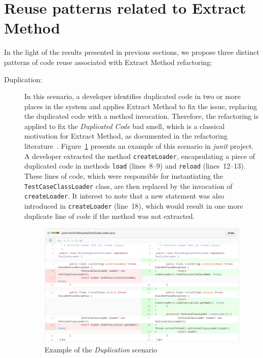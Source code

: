 \section{Reuse patterns related to Extract Method}
\label{reusepatterns}



In the light of the results presented in previous sections, we propose three distinct patterns of code reuse associated with Extract Method refactoring:
\begin{description}
\item[Duplication:] In this scenario, a developer identifies duplicated code in two or more places in the system and applies Extract Method to fix the issue, replacing the duplicated code with a method invocation.
Therefore, the refactoring is applied to fix the \emph{Duplicated Code} bad smell, which is a classical motivation for Extract Method, as documented in the refactoring literature~\citep{Fowler:1999}.
Figure~\ref{iexdup} presents an example of this scenario in \textit{junit} project. A developer extracted the method \texttt{createLoader}, encapsulating a piece of duplicated code in methods \texttt{load} (lines~8--9) and \texttt{reload} (lines~12--13).
These lines of code, which were responsible for instantiating the \texttt{TestCaseClassLoader} class, are then replaced by the invocation of \texttt{createLoader}. It interest to note that a new statement was also introduced in \texttt{createLoader} (line~18), which would result in one more duplicate line of code if the method was not extracted.

\begin{figure}[htbp]\centering
\includegraphics[width=1\textwidth]{img/ch5/dup.pdf}
\caption{Example of the \textit{Duplication} scenario}
\label{iexdup}
\end{figure}  



\end{description}

